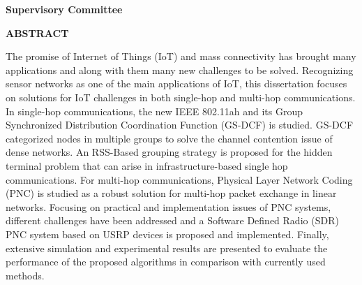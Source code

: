 \newpage
{}

\noindent \textbf{Supervisory Committee}
\tpbreak
\panel

\begin{center}
\textbf{ABSTRACT}
\end{center}

The promise of Internet of Things (IoT) and mass connectivity has brought many applications and along with them many new challenges to be solved. Recognizing sensor networks as one of the main applications of IoT, this dissertation focuses on solutions for IoT challenges in both single-hop and multi-hop communications. In single-hop communications, the new IEEE 802.11ah and its Group Synchronized Distribution Coordination Function (GS-DCF) is studied. GS-DCF categorized nodes in multiple groups to solve the channel contention issue of dense networks. An RSS-Based grouping strategy is proposed for the hidden terminal problem that can arise in infrastructure-based single hop communications. For multi-hop communications, Physical Layer Network Coding (PNC) is studied as a robust solution for multi-hop packet exchange in linear networks. Focusing on practical and implementation issues of PNC systems, different challenges have been addressed and a Software Defined Radio (SDR) PNC system based on USRP devices is proposed and implemented. Finally, extensive simulation and experimental results are presented to evaluate the performance of the proposed algorithms in comparison with currently used methods.